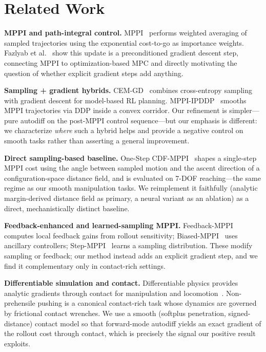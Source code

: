 \documentclass[journal]{IEEEtran}
\begin{document}
\section{Related Work}
\label{sec:related}

\textbf{MPPI and path-integral control.}
MPPI~\cite{williams2017mppi} performs weighted averaging of sampled trajectories
using the exponential cost-to-go as importance weights. Fazlyab et
al.~\cite{fazlyab2026mppi_gd} show this update is a preconditioned gradient
descent step, connecting MPPI to optimization-based MPC and directly motivating
the question of whether explicit gradient steps add anything.

\textbf{Sampling + gradient hybrids.}
CEM-GD~\cite{bharadhwaj2020cemgd} combines cross-entropy sampling with gradient
descent for model-based RL planning. MPPI-IPDDP~\cite{mppi_ipddp} smooths MPPI
trajectories via DDP inside a convex corridor. Our refinement is simpler---pure
autodiff on the post-MPPI control sequence---but our emphasis is different: we
characterize \emph{where} such a hybrid helps and provide a negative control on
smooth tasks rather than asserting a general improvement.

\textbf{Direct sampling-based baseline.}
One-Step CDF-MPPI~\cite{cdf_mppi} shapes a single-step MPPI cost using the angle
between sampled motion and the ascent direction of a configuration-space
distance field, and is evaluated on 7-DOF reaching---the same regime as our
smooth manipulation tasks. We reimplement it faithfully (analytic
margin-derived distance field as primary, a neural variant as an ablation) as a
direct, mechanistically distinct baseline.

\textbf{Feedback-enhanced and learned-sampling MPPI.}
Feedback-MPPI~\cite{belvedere2026feedback_mppi} computes local feedback gains
from rollout sensitivity; Biased-MPPI~\cite{trevisan2024biased_mppi} uses
ancillary controllers; Step-MPPI~\cite{step_mppi} learns a sampling
distribution. These modify sampling or feedback; our method instead adds an
explicit gradient step, and we find it complementary only in contact-rich
settings.

\textbf{Differentiable simulation and contact.}
Differentiable physics provides analytic gradients through contact for
manipulation and locomotion~\cite{diffmpc2025,cunrto2026}. Non-prehensile
pushing is a canonical contact-rich task whose dynamics are governed by frictional
contact wrenches. We use a smooth (softplus penetration, signed-distance) contact
model so that forward-mode autodiff yields an exact gradient of the rollout cost
through contact, which is precisely the signal our positive result exploits.
\end{document}
